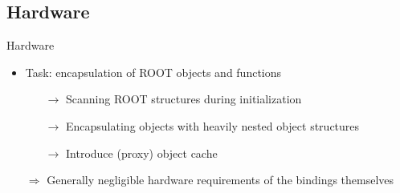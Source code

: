 \subsection{Hardware}
\begin{frame}{Hardware}
  \begin{itemize}
    \item Task: encapsulation of ROOT objects and functions
    \begin{itemize}
      \item[$\rightarrow$] \textcolor{kit-blue100}{Scanning ROOT structures during initialization}
      \item[$\rightarrow$] \textcolor{kit-blue100}{Encapsulating objects with heavily nested object structures}
      \item[$\rightarrow$] \textcolor{kit-green70}{Introduce (proxy) object cache}
    \end{itemize}
    \vspace{10mm}
    \pause
    \item[$\Rightarrow$] Generally negligible hardware requirements of the bindings themselves
  \end{itemize}
\end{frame}

